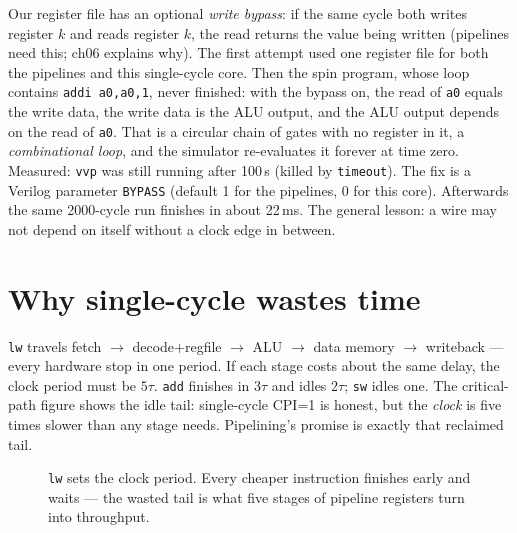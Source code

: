\begin{example}\label{ex:loop-bypass05}
Our register file has an optional \emph{write bypass}: if the same
cycle both writes register $k$ and reads register $k$, the read
returns the value being written (pipelines need this; ch06 explains
why). The first attempt used one register file for both the pipelines
and this single-cycle core. Then the spin program, whose loop contains
\texttt{addi a0,a0,1}, never finished: with the bypass on, the read of
\texttt{a0} equals the write data, the write data is the ALU output,
and the ALU output depends on the read of \texttt{a0}. That is a
circular chain of gates with no register in it, a \emph{combinational
loop}, and the simulator re-evaluates it forever at time zero.
Measured: \texttt{vvp} was still running after 100\,s (killed by
\texttt{timeout}). The fix is a Verilog parameter \texttt{BYPASS}
(default 1 for the pipelines, 0 for this core). Afterwards the same
2000-cycle run finishes in about 22\,ms. The general lesson: a wire
may not depend on itself without a clock edge in between.
\end{example}

\section{Why single-cycle wastes time}
\label{sec:critpath05}

\begin{example}\label{ex:crit05}
\texttt{lw} travels fetch $\to$ decode+regfile $\to$ ALU $\to$ data
memory $\to$ writeback --- every hardware stop in one period. If each
stage costs about the same delay, the clock period must be $5\tau$.
\texttt{add} finishes in $3\tau$ and idles $2\tau$; \texttt{sw}
idles one. The critical-path figure shows the idle tail: single-cycle
CPI=1 is honest, but the \emph{clock} is five times slower than any
stage needs. Pipelining's promise is exactly that reclaimed tail.
\end{example}

\begin{figure}[t]
\centering

\caption[Critical path]{\texttt{lw} sets the clock period. Every
cheaper instruction finishes early and waits --- the wasted tail is
what five stages of pipeline registers turn into throughput.}
\label{fig:critpath05}
\end{figure}

